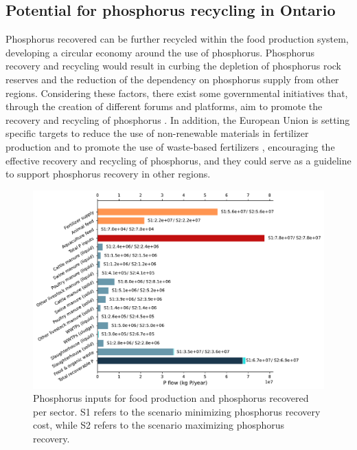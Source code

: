 \documentclass[]{elsarticle}
\begin{document}
\subsection{Potential for phosphorus recycling in Ontario}
Phosphorus recovered can be further recycled within the food production system, developing a circular economy around the use of phosphorus. Phosphorus recovery and recycling would result in curbing the depletion of phosphorus rock reserves and the reduction of the dependency on phosphorus supply from other regions.
Considering these factors, there exist some governmental initiatives that, through the creation of different forums and platforms, aim to promote the recovery and recycling of phosphorus \citep{NRRPlatform, PFlows_Ontario}. In addition, the European Union is setting specific targets to reduce the use of non-renewable materials in fertilizer production \citep{EurpeanComissionNewFertilizersGoal} and to promote the use of waste-based fertilizers \citep{EurpeanComissionFertilizersRegulation}, encouraging the effective recovery and recycling of phosphorus, and they could serve as a guideline to support phosphorus recovery in other regions. 

\begin{figure}[h]
	\centering
	\includegraphics[width=1\linewidth, trim={0cm 0cm 0cm 0cm},clip]{Figures/PSubstitution.pdf} 
	\caption{Phosphorus inputs for food production and phosphorus recovered per sector. S1 refers to the scenario minimizing phosphorus recovery cost, while S2 refers to the scenario maximizing phosphorus recovery.}
	\label{fig:PSubstitution}
\end{figure}
\end{document}
